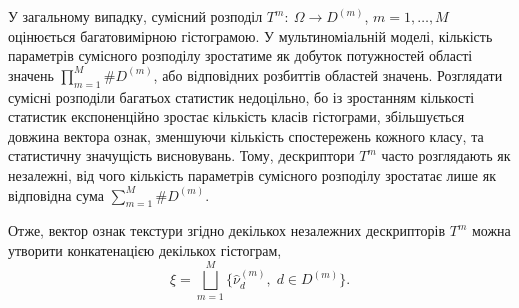 У загальному випадку, сумісний розподіл $T^m\colon\ \Omega \to D^{(m)}$, $m=1,\dots,M$ оцінюється багатовимірною гістограмою. 
У мультиноміальній моделі, кількість параметрів сумісного розподілу зростатиме як добуток потужностей області значень $\prod_{m=1}^M \# D^{(m)}$, або відповідних розбиттів областей значень.
Розглядати сумісні розподіли багатьох статистик недоцільно, бо із зростанням кількості статистик експоненційно зростає кількість класів гістограми, 
збільшується довжина вектора ознак, зменшуючи кількість спостережень кожного класу, та статистичну значущість висновувань.
Тому, дескриптори $T^m$ часто розглядають як незалежні, від чого кількість параметрів сумісного розподілу зростатає лише як відповідна сума $\sum_{m=1}^M \# D^{(m)}$.

Отже, вектор ознак текстури згідно декількох незалежних дескрипторів $T^m$ можна утворити конкатенацією декількох гістограм,
\begin{equation*}
    \xi = \bigsqcup_{m=1}^M \{\hat \nu^{(m)}_d, \; d\in D^{(m)}\}.
\end{equation*}




